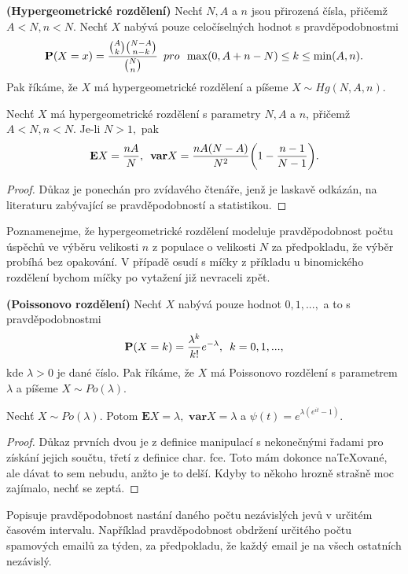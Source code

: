 \begin{definition}{\textbf{(Hypergeometrické rozdělení)}}
Nechť $N, A$ a $n$ jsou přirozená čísla, přičemž $A < N, n < N$. Nechť $X$ nabývá pouze celočíselných hodnot s pravděpodobnostmi 
\begin{equation}
\textbf{P}(X = x)= \frac{\binom{A}{k}\binom{N-A}{n-k}}{\binom{N}{n}} \enskip pro \enskip \max(0, A + n -N)\leq k \leq \min(A, n).
\end{equation}
Pak říkáme, že $X$ má hypergeometrické rozdělení a píšeme $X \sim Hg(N,A,n)$.
\end{definition}
\begin{proposition}
Nechť $X$ má hypergeometrické rozdělení s parametry $N, A$ a $n$, přičemž $A < N, n < N$.  Je-li $N > 1,$ pak 
\begin{equation}
\mathbf{E}X = \frac{nA}{N}, \enskip \mathbf{var}X = \frac{nA(N-A)}{N^{2}}\bigg( 1 - \frac{n-1}{N-1}\bigg).
\end{equation}
\end{proposition}
\begin{proof}
Důkaz je ponechán pro zvídavého čtenáře, jenž je laskavě odkázán, na literaturu zabývající se pravděpodobností a statistikou.
\end{proof}

\begin{remark}
Poznamenejme, že hypergeometrické rozdělení modeluje pravděpodobnost počtu úspěchů ve výběru velikosti $n$ z populace o velikosti $N$ za předpokladu, že výběr probíhá bez opakování. V případě osudí s míčky z příkladu u binomického rozdělení bychom míčky po vytažení již nevraceli zpět.
\end{remark}

\begin{definition}{\textbf{(Poissonovo rozdělení)}}
Nechť $X$ nabývá pouze hodnot $0, 1, ..., $ a to s pravděpodobnostmi 
\begin{equation}
\textbf{P}(X = k) = \frac{\lambda^{k}}{k!}e^{-\lambda},\enskip k = 0, 1, ...,
\end{equation}
kde $\lambda >0$ je dané číslo. Pak říkáme, že $X$ má Poissonovo rozdělení s parametrem $\lambda$ a píšeme $X \sim Po(\lambda)$.
\end{definition}

\begin{proposition}
Nechť $X \sim Po(\lambda)$. Potom $\mathbf{E}X = \lambda,$ $\mathbf{var}X = \lambda$ a $\psi(t) = e^{\lambda(e^{it}-1)}$.
\end{proposition}
\begin{proof}
Důkaz prvních dvou je z definice manipulací s nekonečnými řadami pro získání jejich součtu, třetí z definice char. fce. Toto mám dokonce naTeXované, ale dávat to sem nebudu, anžto je to delší. Kdyby to někoho hrozně strašně moc zajímalo, nechť se zeptá.
\end{proof}
\begin{remark}
Popisuje pravděpodobnost nastání daného počtu nezávislých jevů v určitém časovém intervalu. Například pravděpodobnost obdržení určitého počtu spamových emailů za týden, za předpokladu, že každý email je na všech ostatních nezávislý.
\end{remark}



